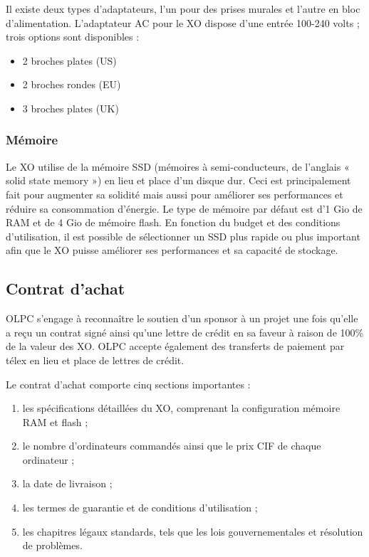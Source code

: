 \documentclass[11pt]{article}
\begin{document}
Il existe deux types d'adaptateurs, l'un pour des prises murales et l'autre
en bloc d'alimentation. L'adaptateur AC pour le XO dispose d'une entrée
100-240 volts ; trois options sont disponibles :

\begin{itemize}
\item 2 broches plates (US)
\item 2 broches rondes (EU)
\item 3 broches plates (UK)
\end{itemize}
\subsubsection{Mémoire}
\label{sec-8-1-3}



Le XO utilise de la mémoire SSD (mémoires à semi-conducteurs, de l'anglais
« solid state memory ») en lieu et place d'un disque dur. Ceci est
principalement fait pour augmenter sa solidité mais aussi pour améliorer
ses performances et réduire sa consommation d'énergie. Le type de mémoire
par défaut est d'1 Gio de RAM et de 4 Gio de mémoire flash. En fonction du
budget et des conditions d'utilisation, il est possible de sélectionner un
SSD plus rapide ou plus important afin que le XO puisse améliorer ses
performances et sa capacité de stockage.
\subsection{Contrat d'achat}
\label{sec-8-2}


OLPC s'engage à reconnaître le soutien d'un sponsor à un projet une fois
qu'elle a reçu un contrat signé ainsi qu'une lettre de crédit en sa faveur
à raison de 100\% de la valeur des XO. OLPC accepte également des
transferts de paiement par télex en lieu et place de lettres de crédit.

Le contrat d'achat comporte cinq sections importantes :

\begin{enumerate}
\item les spécifications détaillées du XO, comprenant la configuration mémoire
   RAM et flash ;
\item le nombre d'ordinateurs commandés ainsi que le prix CIF de chaque
   ordinateur ;
\item la date de livraison ;
\item les termes de guarantie et de conditions d'utilisation ;
\item les chapitres légaux standards, tels que les lois gouvernementales et
   résolution de problèmes.
\end{enumerate}
\end{document}
